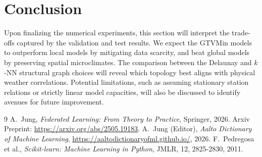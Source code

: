 \documentclass{article}
\begin{document}
\section{Conclusion}
\label{sec:conclusion}

Upon finalizing the numerical experiments, this section will interpret the trade-offs captured by the validation and test results. We expect the GTVMin models to outperform local models by mitigating data scarcity, and beat global models by preserving spatial microclimates. The comparison between the Delaunay and $k$-NN structural graph choices will reveal which topology best aligns with physical weather correlations. Potential limitations, such as assuming stationary station relations or strictly linear model capacities, will also be discussed to identify avenues for future improvement.

\begin{thebibliography}{9}
	 A.~Jung, \textit{Federated Learning: From Theory to Practice}, Springer, 2026. Arxiv Preprint: \url{https://arxiv.org/abs/2505.19183}.
	 A.~Jung (Editor), \textit{Aalto Dictionary of Machine Learning}, \url{https://aaltodictionaryofml.github.io/}, 2026.
     F.~Pedregosa et al., \textit{Scikit-learn: Machine Learning in Python}, JMLR, 12, 2825-2830, 2011.
\end{thebibliography}
\end{document}

